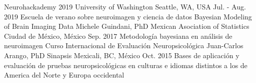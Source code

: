 \begin{cvcourses}
    \cvcourse
        {Neurohackademy 2019}
        {}
        {University of Washington}
        {Seattle, WA, USA}
        {Jul. - Aug. 2019}
        {Escuela de verano sobre neuroimagen y ciencia de datos}
    \cvcourse
        {Bayesian Modeling of Brain Imaging Data}
        {Michele Guindani, PhD}
        {Mexican Asociation of Statistics}
        {Ciudad de México, México}
        {Sep. 2017}
        {Metodología bayesiana en análisis de neuroimagen}
    \cvcourse
        {Curso Internacional de Evaluación Neuropsicológica}
        {Juan-Carlos Arango, PhD}
        {Sinapsis}
        {Mexicali, BC, México}
        {Oct. 2015}
        {Bases de aplicación y evaluación de pruebas neuropsicológicas en culturas e idiomas distintos a los de America del Norte y Europa occidental}
\end{cvcourses}

